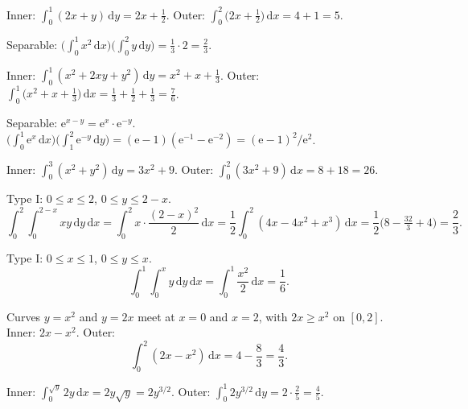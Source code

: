 \begin{solutions}
  \item Inner: $\int_{0}^{1}(2x+y)\,\mathrm{d}y=2x+\tfrac12$. Outer:
        $\int_{0}^{2}\bigl(2x+\tfrac12\bigr)\,\mathrm{d}x=4+1=5$.

  \item Separable:
        $\bigl(\int_{0}^{1} x^{2}\,\mathrm{d}x\bigr)\bigl(\int_{0}^{2} y\,\mathrm{d}y\bigr)
        =\frac{1}{3}\cdot 2=\frac{2}{3}$.

  \item Inner: $\int_{0}^{1}(x^{2}+2xy+y^{2})\,\mathrm{d}y
        =x^{2}+x+\tfrac13$. Outer:
        $\int_{0}^{1}\bigl(x^{2}+x+\tfrac13\bigr)\,\mathrm{d}x
        =\tfrac13+\tfrac12+\tfrac13=\frac{7}{6}$.

  \item Separable: $\mathrm{e}^{x-y}=\mathrm{e}^{x}\cdot\mathrm{e}^{-y}$.
        $\bigl(\int_{0}^{1} \mathrm{e}^{x}\,\mathrm{d}x\bigr)
        \bigl(\int_{1}^{2} \mathrm{e}^{-y}\,\mathrm{d}y\bigr)
        =(\mathrm{e}-1)(\mathrm{e}^{-1}-\mathrm{e}^{-2})
        =(\mathrm{e}-1)^{2}/\mathrm{e}^{2}$.

  \item Inner: $\int_{0}^{3}(x^{2}+y^{2})\,\mathrm{d}y=3x^{2}+9$. Outer:
        $\int_{0}^{2}(3x^{2}+9)\,\mathrm{d}x=8+18=26$.

  \item Type I: $0\le x\le 2$, $0\le y\le 2-x$.
        \[
          \int_{0}^{2}\int_{0}^{2-x} xy\,\mathrm{d}y\,\mathrm{d}x
            =\int_{0}^{2} x\cdot\frac{(2-x)^{2}}{2}\,\mathrm{d}x
            =\frac{1}{2}\int_{0}^{2} (4x-4x^{2}+x^{3})\,\mathrm{d}x
            =\frac{1}{2}\bigl(8-\tfrac{32}{3}+4\bigr)=\frac{2}{3} .
        \]

  \item Type I: $0\le x\le 1$, $0\le y\le x$.
        \[
          \int_{0}^{1}\int_{0}^{x} y\,\mathrm{d}y\,\mathrm{d}x
            =\int_{0}^{1} \frac{x^{2}}{2}\,\mathrm{d}x=\frac{1}{6} .
        \]

  \item Curves $y=x^{2}$ and $y=2x$ meet at $x=0$ and $x=2$, with
        $2x\ge x^{2}$ on $[0,2]$. Inner: $2x-x^{2}$. Outer:
        \[
          \int_{0}^{2} (2x-x^{2})\,\mathrm{d}x=4-\frac{8}{3}=\frac{4}{3} .
        \]

  \item Inner: $\int_{0}^{\sqrt{y}} 2y\,\mathrm{d}x=2y\sqrt{y}=2y^{3/2}$.
        Outer: $\int_{0}^{1} 2y^{3/2}\,\mathrm{d}y=2\cdot\frac{2}{5}=\frac{4}{5}$.


\end{solutions}
